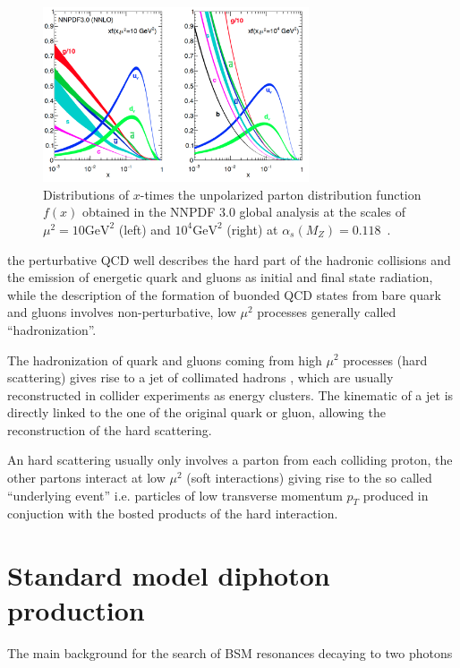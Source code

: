 \begin{figure}
  \centering
  \includegraphics[width = 0.7\textwidth]{figures/introduction/pdfs.png}
  \caption{
    Distributions of $x$-times the unpolarized parton distribution function $f(x)$
    obtained in the NNPDF 3.0 global analysis at the scales of $\mu^2 = 10 \mathrm{GeV}^2$ (left) and
    $10^4 \mathrm{GeV}^2$ (right) at $\alpha_s(M_Z) = 0.118$~\cite{pdfs}.}
  \label{fig:pdfs}
\end{figure}

the perturbative QCD well describes the hard part of the hadronic collisions and the emission of
energetic quark and gluons as initial and final state radiation,
while the description of the formation of buonded QCD states from bare quark and gluons involves non-perturbative, low $\mu^2$
processes generally called ``hadronization''. 

The hadronization of quark and gluons coming from high $\mu^2$ processes (hard scattering) gives rise
to a jet of collimated hadrons , which are usually reconstructed in collider experiments as energy clusters.
The kinematic of a jet is directly linked to the one of the original quark or gluon, allowing the reconstruction
of the hard scattering.

An hard scattering usually only involves a parton from each colliding proton, the other partons interact at low $\mu^2$
(soft interactions) giving rise to the so called ``underlying event'' i.e. particles of low transverse momentum $p_T$
produced in conjuction with the bosted products of the hard interaction.

\section{Standard model diphoton production}
The main background for the search of BSM resonances decaying to two photons 